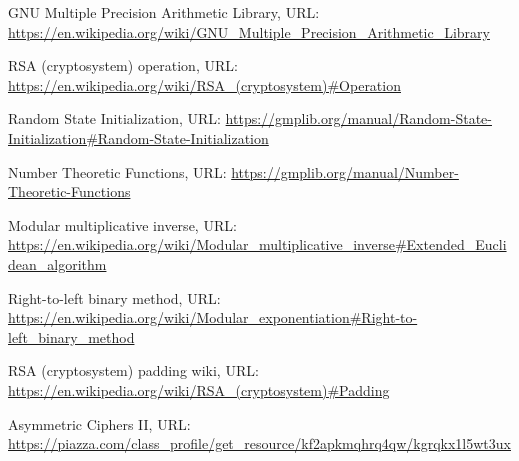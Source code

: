 \documentclass[11 pt]{article}
\begin{document}
\begin{thebibliography}{10}

	GNU Multiple Precision Arithmetic Library, URL: \url{https://en.wikipedia.org/wiki/GNU_Multiple_Precision_Arithmetic_Library}
	
	RSA (cryptosystem) operation, URL: \url{https://en.wikipedia.org/wiki/RSA_(cryptosystem)#Operation}

	Random State Initialization, URL: \url{https://gmplib.org/manual/Random-State-Initialization#Random-State-Initialization}

	Number Theoretic Functions, URL: \url{https://gmplib.org/manual/Number-Theoretic-Functions}

	Modular multiplicative inverse, URL: \url{https://en.wikipedia.org/wiki/Modular_multiplicative_inverse#Extended_Euclidean_algorithm}

	Right-to-left binary method, URL: \url{https://en.wikipedia.org/wiki/Modular_exponentiation#Right-to-left_binary_method}
	
	RSA (cryptosystem) padding wiki, URL: \url{https://en.wikipedia.org/wiki/RSA_(cryptosystem)#Padding}

	Asymmetric Ciphers II, URL: \url{https://piazza.com/class_profile/get_resource/kf2apkmqhrq4qw/kgrqkx1l5wt3ux}
	
\end{thebibliography}
\end{document}
